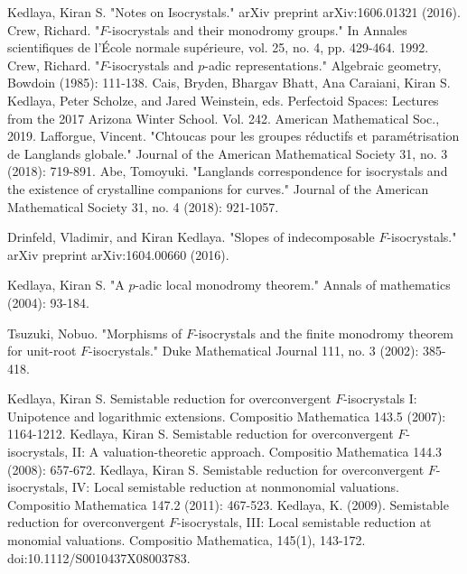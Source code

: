 \documentclass[11pt]{book}
\theoremstyle{definition}
\numberwithin{equation}{section}
\begin{document}
\newpage



\begin{thebibliography}{10}
 Kedlaya, Kiran S. "Notes on Isocrystals." arXiv preprint arXiv:1606.01321 (2016).
 Crew, Richard. "$F$-isocrystals and their monodromy groups." In Annales scientifiques de l'\'Ecole normale sup\'erieure, vol. 25, no. 4, pp. 429-464. 1992.
 Crew, Richard. "$F$-isocrystals and $p$-adic representations." Algebraic geometry, Bowdoin (1985): 111-138.
 Cais, Bryden, Bhargav Bhatt, Ana Caraiani, Kiran S. Kedlaya, Peter Scholze, and Jared Weinstein, eds. Perfectoid Spaces: Lectures from the 2017 Arizona Winter School. Vol. 242. American Mathematical Soc., 2019.
 Lafforgue, Vincent. "Chtoucas pour les groupes r\'eductifs et param\'etrisation de Langlands globale." Journal of the American Mathematical Society 31, no. 3 (2018): 719-891.
 Abe, Tomoyuki. "Langlands correspondence for isocrystals and the existence of crystalline companions for curves." Journal of the American Mathematical Society 31, no. 4 (2018): 921-1057.

 Drinfeld, Vladimir, and Kiran Kedlaya. "Slopes of indecomposable $F$-isocrystals." arXiv preprint arXiv:1604.00660 (2016). 

 Kedlaya, Kiran S. "A $p$-adic local monodromy theorem." Annals of mathematics (2004): 93-184. 

 Tsuzuki, Nobuo. "Morphisms of $F$-isocrystals and the finite monodromy theorem for unit-root $F$-isocrystals." Duke Mathematical Journal 111, no. 3 (2002): 385-418.  

 Kedlaya, Kiran S. Semistable reduction for overconvergent $F$-isocrystals I: Unipotence and logarithmic extensions. Compositio Mathematica 143.5 (2007): 1164-1212.
 Kedlaya, Kiran S. Semistable reduction for overconvergent $F$-isocrystals, II: A valuation-theoretic approach. Compositio Mathematica 144.3 (2008): 657-672.
 Kedlaya, Kiran S. Semistable reduction for overconvergent $F$-isocrystals, IV: Local semistable reduction at nonmonomial valuations. Compositio Mathematica 147.2 (2011): 467-523.
 Kedlaya, K. (2009). Semistable reduction for overconvergent $F$-isocrystals, III: Local semistable reduction at monomial valuations. Compositio Mathematica, 145(1), 143-172. doi:10.1112/S0010437X08003783. 





\end{thebibliography}
\end{document}
